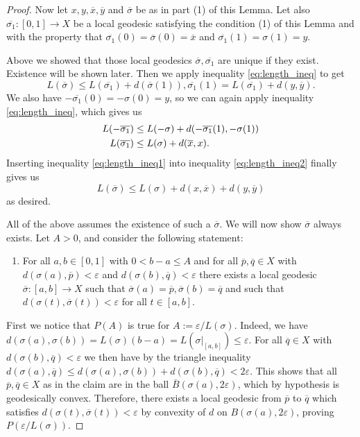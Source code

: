\documentclass[10pt,a4paper]{amsart}
\begin{document}
\begin{proof}
Now let \(x,y,\overline{x},\overline{y}\) and \(\overline{\sigma}\) be as in part (1) of this Lemma. Let also \(\overline{\sigma_1}:[0,1]\to X\) be a local geodesic satisfying the condition (1) of this Lemma and with the property that $\overline{\sigma_1}(0)=\overline{\sigma}(0)=\overline{x}$ and $\overline{\sigma_1}(1)=\sigma(1)=y$.

Above we showed that those local geodesics $\overline{\sigma}, \overline{\sigma_1}$ are unique if they exist. Existence will be shown later. Then we apply inequality \eqref{eq:length_ineq} to get 
\begin{equation}\label{eq:length_ineq1}
L(\overline{\sigma})\leq L(\overline{\sigma_1})+d(\overline{\sigma}(1)),\overline{\sigma_1}(1)=L(\overline{\sigma_1})+d(y,\overline{y}).
\end{equation}
We also have \(-\overline{\sigma_1}(0)=-\sigma(0)=y\), so we can again apply inequality \eqref{eq:length_ineq}, which gives us \begin{align}
L(-\overline{\sigma_1})&\leq L(-\sigma)+d(-\overline{\sigma_1}(1),-\sigma(1)) \notag\\
L(\overline{\sigma_1})&\leq L(\sigma)+d(\overline{x},x)\label{eq:length_ineq2}.
\end{align}
Inserting inequality \eqref{eq:length_ineq1} into inequality \eqref{eq:length_ineq2} finally gives us
\[L(\overline{\sigma})\leq L(\sigma)+d(x,\overline{x})+d(y,\overline{y})\]
as desired.

\medskip
All of the above assumes the existence of such a \(\overline{\sigma}\).
We will now show \(\overline{\sigma}\) always exists.
Let \(A>0\), and consider the following statement:
\begin{enumerate}
    \item[\(P(A)\)]
For all \(a,b\in [0,1]\) with \(0<b-a\leq A\) and for all \(\overline{p},\overline{q}\in X\) with \(d(\sigma(a),\overline{p})<\varepsilon\) and \(d(\sigma(b),\overline{q})<\varepsilon\) there exists a local geodesic \(\overline{\sigma}:[a,b]\to X\) such that \(\overline{\sigma}(a)=\overline{p},\overline{\sigma}(b)=\overline{q}\) and such that \(d(\sigma(t),\overline{\sigma}(t))<\varepsilon\) for all \(t\in [a,b]\).
\end{enumerate}


First we notice that $P(A)$  is true for \(A:=\varepsilon/L(\sigma)\). Indeed, we have 
\(d(\sigma(a),\sigma(b))=L(\sigma)(b-a)=L(\sigma|_{[a,b]})\leq\varepsilon\).
For all \(\overline{q}\in X\) with \(d(\sigma(b),\overline{q})<\varepsilon\) we then have by the triangle inequality \(d(\sigma(a),\overline{q})\leq d(\sigma(a),\sigma(b))+d(\sigma(b),\overline{q})<2\varepsilon\).
This shows that all \(\overline{p},\overline{q}\in X\) as in the claim are in the ball \(\overline{B}(\sigma(a),2\varepsilon)\), which by hypothesis is geodesically convex.
Therefore, there exists a local geodesic from \(\overline{p}\) to \(\overline{q}\) which satisfies \(d(\sigma(t),\overline{\sigma}(t))<\varepsilon\) by convexity of \(d\) on \(B(\sigma(a),2\varepsilon)\), proving \(P(\varepsilon/L(\sigma))\).


\end{proof}
\end{document}
